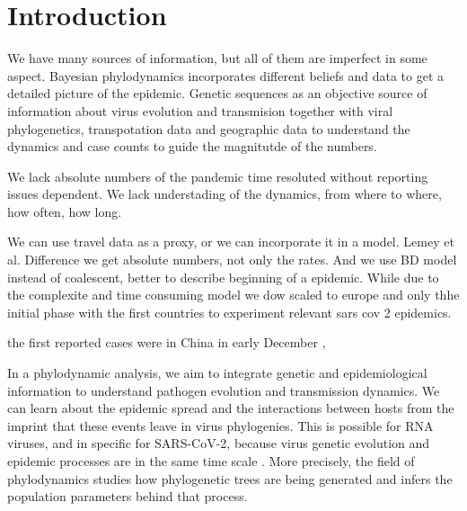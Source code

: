 \chapter{Introduction}

We have many sources of information, but all of them are imperfect in some aspect. Bayesian phylodynamics incorporates different beliefs and data to get a detailed picture of the epidemic. Genetic sequences as an objective source of information about virus evolution and transmision together with viral phylogenetics, transpotation data and geographic data to understand the dynamics and case counts to guide the magnitutde of the numbers.

We lack absolute numbers of the pandemic time resoluted without reporting issues dependent. We lack understading of the dynamics, from where to where, how often, how long.

We can use travel data as a proxy, or we can incorporate it in a model. Lemey et al. Difference we get absolute numbers, not only the rates. And we use BD model instead of coalescent, better to describe beginning of a epidemic. While due to the complexite and time consuming model we dow scaled to europe and only thhe initial phase with the first countries to experiment relevant sars cov 2 epidemics. 

the first reported cases were in China in early December \cite{},


In a phylodynamic analysis, we aim to integrate genetic and epidemiological information to understand pathogen evolution and transmission dynamics. We can learn about the epidemic spread and the interactions between hosts from the imprint that these events leave in virus phylogenies. This is possible for RNA viruses, and in specific for SARS-CoV-2, because virus genetic evolution and epidemic processes are in the same time scale \cite{Grenfell2013} \cite{Volz2014}.  More precisely, the field of phylodynamics studies how phylogenetic trees are being generated and infers the population parameters behind that process. 
